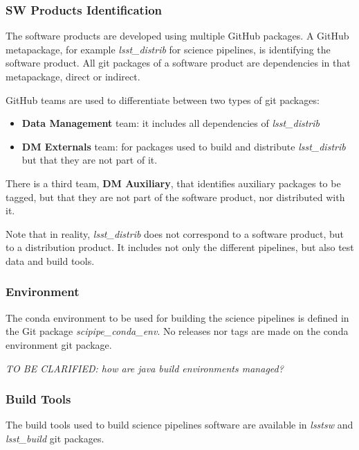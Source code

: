 \subsubsection{SW Products Identification} \label{sec:statusIdentification}

The software products are developed using multiple GitHub packages. 
A GitHub metapackage, for example \textit{lsst\_distrib} for science pipelines, is identifying the software product. 
All git packages of a software product are dependencies in that metapackage, direct or indirect.

GitHub teams are used to differentiate between two types of git packages:

\begin{itemize}
\item \textbf{Data Management} team: it includes all dependencies of \textit{lsst\_distrib}
\item \textbf{DM Externals} team: for packages used to build and distribute \textit{lsst\_distrib} but that they are not part of it.
\end{itemize}

There is a third team, \textbf{DM Auxiliary}, that identifies auxiliary packages to be tagged, but that they are not part of the software product, nor distributed with it.

Note that in reality, \textit{lsst\_distrib} does not correspond to a software product, but to a distribution product.
It includes not only the different pipelines, but also test data and build tools.


\subsubsection{Environment} \label{sec:statusEnvs}

The conda environment to be used for building the science pipelines is defined in the Git package \textit{scipipe\_conda\_env}.
No releases nor tags are made  on the conda environment git package.

\textit{TO BE CLARIFIED: how are java build environments managed?}


\subsubsection{Build Tools} \label{sec:statusTools}

The build tools used to build science pipelines software are available in \textit{lsstsw} and \textit{lsst\_build} git packages.

